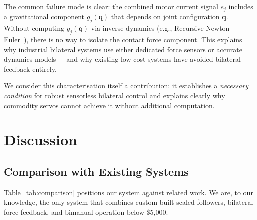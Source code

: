 \documentclass[conference]{IEEEtran}
\begin{document}
The common failure mode is clear: the combined motor current signal $e_j$ includes a gravitational component $g_j(\mathbf{q})$ that depends on joint configuration $\mathbf{q}$. Without computing $g_j(\mathbf{q})$ via inverse dynamics (e.g., Recursive Newton-Euler~\cite{lynch2017modern}), there is no way to isolate the contact force component. This explains why industrial bilateral systems use either dedicated force sensors or accurate dynamics models~\cite{fast_bilateral2025}---and why existing low-cost systems have avoided bilateral feedback entirely.

We consider this characterisation itself a contribution: it establishes a \emph{necessary condition} for robust sensorless bilateral control and explains clearly why commodity servos cannot achieve it without additional computation.

\section{Discussion}

\subsection{Comparison with Existing Systems}

Table~\ref{tab:comparison} positions our system against related work. We are, to our knowledge, the only system that combines custom-built scaled followers, bilateral force feedback, and bimanual operation below \$5,000.
\end{document}
